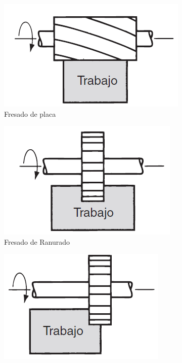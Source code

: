 \begin{figure}[hbt]
    \centering
    \begin{subfigure}{0.4\textwidth}
        \centering
        \includegraphics[width=0.9\linewidth]{Cap1_FormulaciondelProyecto/Figuras/FrsadodePlaca.PNG}
        \caption{Fresado de placa}
        \label{fig:Fresadodeplaca}
    \end{subfigure} 
    \begin{subfigure}{0.4\textwidth}
        \centering
        \includegraphics[width=0.9\linewidth]{Cap1_FormulaciondelProyecto/Figuras/FrsadodeRanurado.PNG}
        \caption{Fresado de Ranurado}
        \label{fig:Fresadoderanurado}
    \end{subfigure} 
    \begin{subfigure}{0.4\textwidth}
        \centering
        \includegraphics[width=0.9\linewidth]{Cap1_FormulaciondelProyecto/Figuras/Fresadolateral.PNG}

\end{subfigure}
\end{figure}
